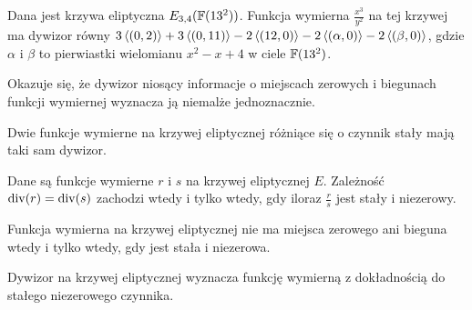 \begin{example}
Dana jest krzywa eliptyczna $E_{3, 4}(\mathbb{F}(13^2))$.
Funkcja wymierna $\frac{x^3}{y^2}$ na tej krzywej
ma dywizor równy
$3\left\langle(0, 2)\right\rangle
+ 3\left\langle(0, 11)\right\rangle
- 2\left\langle(12, 0)\right\rangle
- 2\left\langle(\alpha, 0)\right\rangle
- 2\left\langle(\beta, 0)\right\rangle$,
gdzie $\alpha$ i $\beta$ to pierwiastki wielomianu $x^2 - x + 4$
w ciele $\mathbb{F}(13^2)$.
\end{example}

\noindent
Okazuje się, że dywizor niosący informacje o miejscach zerowych i biegunach
funkcji wymiernej wyznacza ją niemalże jednoznacznie.

\begin{fact}
Dwie funkcje wymierne na krzywej eliptycznej
różniące się o czynnik stały mają taki sam dywizor.
\end{fact}

\begin{theorem}
Dane są funkcje wymierne $r$ i $s$ na krzywej eliptycznej $E$.
Zależność $\operatorname{div}(r) = \operatorname{div}(s)$ zachodzi wtedy i tylko wtedy,
gdy iloraz $\frac{r}{s}$ jest stały i niezerowy.
\end{theorem}

\begin{corollary}\label{zero_div_const_fun_coro}
Funkcja wymierna na krzywej eliptycznej
nie ma miejsca zerowego ani bieguna wtedy i tylko wtedy,
gdy jest stała i niezerowa.
\end{corollary}

\begin{corollary}\label{fun_divi_equiv_to_const_lemma}
Dywizor na krzywej eliptycznej
wyznacza funkcję wymierną z dokładnością do stałego niezerowego czynnika.
\end{corollary}
